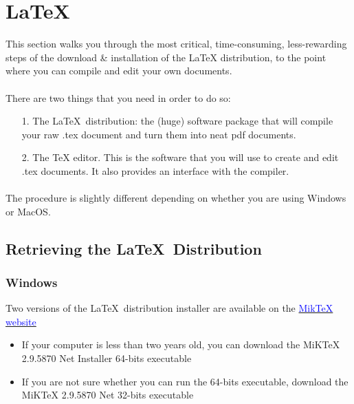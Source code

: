 \documentclass{report}
\begin{document}
\section{\LaTeX\ }


This section walks you through the most critical, time-consuming, less-rewarding steps of  the download \& installation of the LaTeX distribution, to the point where you can compile and edit your own documents. 
\paragraph{}
There are two things that you need in order to do so:
\begin{itemize}
\item[1.] The \LaTeX\ distribution: the (huge) software package that will compile your raw .tex document and turn them into  neat pdf documents.
\item[2.]  The TeX editor. This is the software that you will use to create and edit .tex documents. It also provides an interface with the compiler.
\end{itemize}
\paragraph{}
The procedure is slightly different depending on whether you are using Windows or MacOS.

\subsection{Retrieving the \LaTeX\ Distribution }

\subsubsection*{Windows}
Two versions of the \LaTeX\ distribution installer are available on the  \href{http://www.miktex.org/download
}{\textcolor{blue}{MikTeX website}}



\begin{itemize}
\item If your computer is less than two years old,
you can download the MiKTeX 2.9.5870 Net Installer 64-bits executable
\item If you are not sure whether you can run the 64-bits executable, 
download the MiKTeX 2.9.5870 Net 32-bits executable 
\end{itemize}
\end{document}

